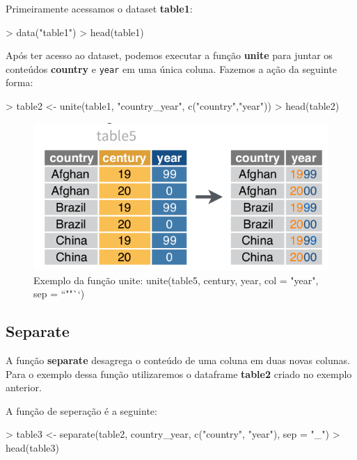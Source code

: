 \documentclass[12pt,a4paper,oneside]{erdc}
\begin{document}
Primeiramente acessamos o dataset \textbf{table1}:

\begin{Schunk}
\begin{Sinput}
> data("table1")
> head(table1)
\end{Sinput}
\end{Schunk}

Após ter acesso ao dataset, podemos executar a função \textbf{unite} para juntar os conteúdos \textbf{country} e \texttt{year} em uma única coluna. Fazemos a ação da seguinte forma:

\begin{Schunk}
\begin{Sinput}
> table2 <- unite(table1, "country_year", c("country","year"))
> head(table2)
\end{Sinput}
\end{Schunk}

\begin{figure}[htpb]
	\centering
	\includegraphics[width=.6\linewidth]{../figs/BP_Curso_TecComp_00_2019_f03-06.png}
	\caption{Exemplo da função unite: unite(table5, century, year,
		col = "year", sep = ``""``)}
	\label{fig:bpcursoteccomp002019f03-06}
\end{figure}	
	
	
\subsection{Separate}

A função \textbf{separate} desagrega o conteúdo de uma coluna em duas novas colunas. Para o exemplo dessa função utilizaremos o dataframe \textbf{table2} criado no exemplo anterior.

A função de seperação é a seguinte:

\begin{Schunk}
\begin{Sinput}
> table3 <- separate(table2, country_year, c("country", "year"), sep = "_")
> head(table3)
\end{Sinput}
\end{Schunk}
\end{document}
